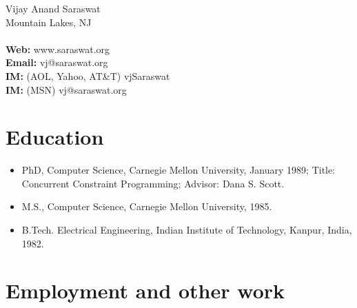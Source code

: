 \documentclass{article}
\begin{document}

\begin{center}
Vijay Anand Saraswat\\
Mountain Lakes, NJ\\
\quad\\
{\bf Web:} www.saraswat.org\\
{\bf Email:} vj@saraswat.org\\
{\bf IM:} (AOL, Yahoo, AT\&T) vjSaraswat\\
{\bf IM:} (MSN) vj@saraswat.org\\
\end{center}

\section*{Education}
\begin{itemize}
\item PhD, Computer Science, Carnegie Mellon University, January 1989;
   Title: Concurrent Constraint Programming;
   Advisor: Dana S. Scott.

\item M.S., Computer Science, Carnegie Mellon University, 1985.

\item B.Tech. Electrical Engineering, Indian Institute of Technology,
   Kanpur, India, 1982.
\end{itemize}

\section*{Employment and other work}
\end{document}
